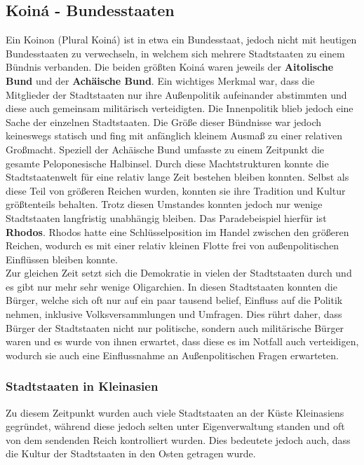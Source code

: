 \documentclass{article}
\begin{document}
	\subsection{Koiná - Bundesstaaten}
	Ein Koinon (Plural Koiná) ist in etwa ein Bundesstaat, jedoch nicht mit heutigen Bundesstaaten zu verwechseln, in welchem sich mehrere Stadtstaaten zu einem Bündnis verbanden. Die beiden größten Koiná waren jeweils der \textbf{Aitolische Bund} und der \textbf{Achäische Bund}. Ein wichtiges Merkmal war, dass die Mitglieder der Stadtstaaten nur ihre Außenpolitik aufeinander abstimmten und diese auch gemeinsam militärisch verteidigten. Die Innenpolitik blieb jedoch eine Sache der einzelnen Stadtstaaten. Die Größe dieser Bündnisse war jedoch keineswegs statisch und fing mit anfänglich kleinem Ausmaß zu einer relativen Großmacht. Speziell der Achäische Bund umfasste zu einem Zeitpunkt die gesamte Peloponesische Halbinsel. Durch diese Machtstrukturen konnte die Stadtstaatenwelt für eine relativ lange Zeit bestehen bleiben konnten. Selbst als diese Teil von größeren Reichen wurden, konnten sie ihre Tradition und Kultur größtenteils behalten. Trotz diesen Umstandes konnten jedoch nur wenige Stadtstaaten langfristig unabhängig bleiben. Das Paradebeispiel hierfür ist \textbf{Rhodos}. Rhodos hatte eine Schlüsselposition im Handel zwischen den größeren Reichen, wodurch es mit einer relativ kleinen Flotte frei von außenpolitischen Einflüssen bleiben konnte. \\
	Zur gleichen Zeit setzt sich die Demokratie in vielen der Stadtstaaten durch und es gibt nur mehr sehr wenige Oligarchien. In diesen Stadtstaaten konnten die Bürger, welche sich oft nur auf ein paar tausend belief, Einfluss auf die Politik nehmen, inklusive Volksversammlungen und Umfragen. Dies rührt daher, dass Bürger der Stadtstaaten nicht nur politische, sondern auch militärische Bürger waren und es wurde von ihnen erwartet, dass diese es im Notfall auch verteidigen, wodurch sie auch eine Einflussnahme an Außenpolitischen Fragen erwarteten. \\
	\subsubsection{Stadtstaaten in Kleinasien}
	Zu diesem Zeitpunkt wurden auch viele Stadtstaaten an der Küste Kleinasiens gegründet, während diese jedoch selten unter Eigenverwaltung standen und oft von dem sendenden Reich kontrolliert wurden. Dies bedeutete jedoch auch, dass die Kultur der Stadtstaaten in den Osten getragen wurde. \\
\end{document}
